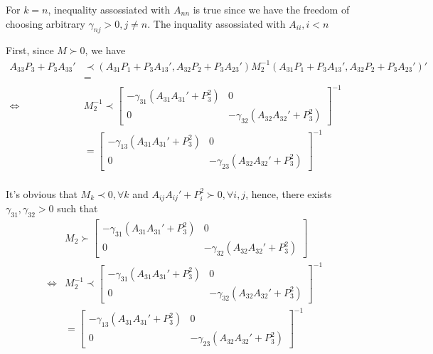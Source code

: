 \documentclass{article}
\begin{document}
For $k=n$, inequality assossiated with $A_{nn}$ is true since we have the freedom of choosing arbitrary $\gamma_{nj}>0,j\neq n$. The inquality assossiated with $A_{ii},i<n$

First, since $M\succ 0$, we have 
\begin{equation}\label{}
\begin{aligned}
A_{33}{P_3}+{P_3}A_{33}' &\prec (A_{31}{P_1}+{P_3}A_{13}',A_{32}{P_2}+{P_3}A_{23}' )M_2^{-1}(A_{31}{P_1}+{P_3}A_{13}',A_{32}{P_2}+{P_3}A_{23}')'\\
&=
\\
\iff&M_2^{-1}\prec \begin{bmatrix}
-\gamma_{31}(A_{31}A_{31}'+P_{3}^2)&0\\
0&-\gamma_{32}(A_{32}A_{32}'+P_{3}^2)
\end{bmatrix}^{-1}\\
&=\begin{bmatrix}
-\gamma_{13}(A_{31}A_{31}'+P_{3}^2)&0\\
0&-\gamma_{23}(A_{32}A_{32}'+P_{3}^2)
\end{bmatrix}^{-1}\\
\end{aligned}
\end{equation}

It's obvious that $M_{k}\prec0, \forall k$ and $A_{ij}A_{ij}'+P_{i}^2 \succ 0, \forall i, j$, hence, there exists $\gamma_{31}, \gamma_{32} >0$ such that 
\begin{equation}\label{}
\begin{aligned}
&M_{2}\succ \begin{bmatrix}
-\gamma_{31}(A_{31}A_{31}'+P_{3}^2)&0\\
0&-\gamma_{32}(A_{32}A_{32}'+P_{3}^2)
\end{bmatrix}\\
\iff&M_2^{-1}\prec \begin{bmatrix}
-\gamma_{31}(A_{31}A_{31}'+P_{3}^2)&0\\
0&-\gamma_{32}(A_{32}A_{32}'+P_{3}^2)
\end{bmatrix}^{-1}\\
&=\begin{bmatrix}
-\gamma_{13}(A_{31}A_{31}'+P_{3}^2)&0\\
0&-\gamma_{23}(A_{32}A_{32}'+P_{3}^2)
\end{bmatrix}^{-1}\\
\end{aligned}
\end{equation}
\end{document}
